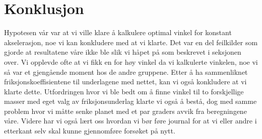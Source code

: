 \documentclass[10pt,a4paper]{report}
\begin{document}
\chapter*{Konklusjon}
Hypotesen vår var at vi ville klare å kalkulere optimal vinkel for konstant akselerasjon, noe vi kan konkludere med at vi klarte. Det var en del feilkilder som gjorde at resultatene våre ikke ble slik vi håpet på som beskrevet i seksjonen over. Vi opplevde ofte at vi fikk en for høy vinkel da vi kalkulerte vinkelen, noe vi så var et gjengående moment hos de andre gruppene. Etter å ha sammenliknet friksjonskoeffisientene til underlagene med nettet, kan vi også konkludere at vi klarte dette. Utfordringen hvor vi ble bedt om å finne vinkel til to forskjellige masser med eget valg av friksjonsunderlag klarte vi også å bestå, dog med samme problem hvor vi måtte senke planet med et par graders avvik fra beregningene våre. Videre har vi også lært oss hvordan vi bør føre journal for at vi eller andre i etterkant selv skal kunne gjennomføre forsøket på nytt.
\end{document}
